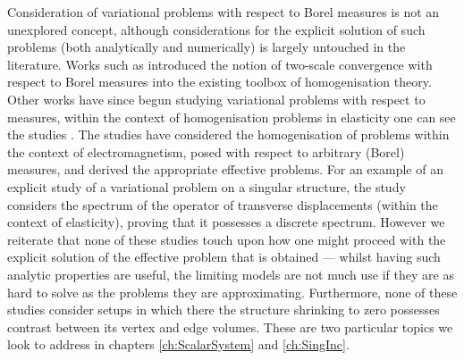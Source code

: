 Consideration of variational problems with respect to Borel measures is not an unexplored concept, although considerations for the explicit solution of such problems (both analytically and numerically) is largely untouched in the literature.
Works such as \cite{bouchitte2001homogenization, zhikov2000extension} introduced the notion of two-scale convergence with respect to Borel measures into the existing toolbox of homogenisation theory.
Other works have since begun studying variational problems with respect to measures, within the context of homogenisation problems in elasticity one can see the studies \cite{zhikov2002homogenization, zhikov2003homogenization, cherednichenko2019homogenisation}.
The studies \cite{cherednichenko2018operator, cherednichenko2022operator, cherednichenko2020order} have considered the homogenisation of problems within the context of electromagnetism, posed with respect to arbitrary (Borel) measures, and derived the appropriate effective problems.
For an example of an explicit study of a variational problem on a singular structure, the study \cite{zhikov2013spectrum} considers the spectrum of the operator of transverse displacements (within the context of elasticity), proving that it possesses a discrete spectrum.
However we reiterate that none of these studies touch upon how one might proceed with the explicit solution of the effective problem that is obtained --- whilst having such analytic properties are useful, the limiting models are not much use if they are as hard to solve as the problems they are approximating.
Furthermore, none of these studies consider setups in which there the structure shrinking to zero possesses contrast between its vertex and edge volumes.
These are two particular topics we look to address in chapters \ref{ch:ScalarSystem} and \ref{ch:SingInc}.

